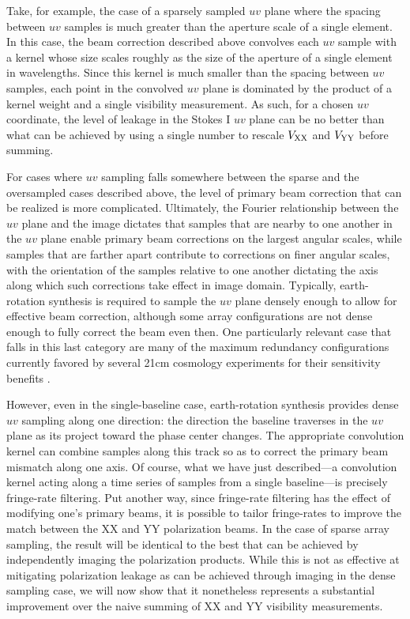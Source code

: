 \documentclass[twocolumn,apj,numberedappendix]{emulateapj}
\begin{document}
Take, for example, the case of a sparsely sampled $uv$ plane where the spacing between $uv$ samples is much greater than
the aperture scale of a single element.  In this case, the beam correction described above 
convolves each $uv$ sample with a kernel whose size scales roughly as the size of the aperture of a
single element in wavelengths.  Since this kernel is much smaller than the spacing between $uv$ samples, 
each point in the convolved $uv$ plane is dominated by the product of a kernel weight and a single visibility measurement.
As such, for a chosen $uv$ coordinate, the level of leakage in the Stokes I $uv$ plane can
be no better than what can be achieved by using a single number to rescale ${V_{\rm XX}}$ and ${V_{\rm YY}}$ before summing.  

For cases where $uv$ sampling falls somewhere between the sparse and the oversampled cases described above, the level
of primary beam correction that can be realized is more complicated.  Ultimately, the Fourier relationship between
the $uv$ plane and the image dictates that samples that are nearby to one
another in the $uv$ plane enable primary beam corrections on the largest angular scales, while samples that are farther
apart contribute to corrections on finer angular scales, with the orientation of the samples relative to one another
dictating the axis along which such corrections take effect in image domain.  Typically, earth-rotation synthesis
is required to sample the $uv$ plane densely enough to allow for effective beam correction, although some array
configurations are not dense enough to fully correct the beam even then.  One particularly relevant case that falls
in this last category are many of the maximum redundancy configurations currently favored by several 21cm cosmology experiments
for their sensitivity benefits \citep{parsons_et_al2012a,P14}.

However, even in the single-baseline case, earth-rotation synthesis provides dense $uv$ sampling along one direction: the
direction the baseline traverses in the $uv$ plane as its project toward the phase center changes.  The appropriate
convolution kernel can combine samples along this track so as to correct the primary beam mismatch along one axis.
Of course, what we have just described---a convolution kernel acting along a time series
of samples from a single baseline---is precisely fringe-rate filtering.  Put another way, since fringe-rate filtering has the effect of modifying one's primary beams, it is possible to tailor fringe-rates to improve the match between the XX and YY polarization beams. In the case of sparse array sampling, the result will be identical to the best that can be achieved by independently
imaging the polarization products.  While this is not as effective at mitigating polarization leakage as can be achieved
through imaging in the dense sampling case, we will now show that it nonetheless represents a substantial improvement
over the naive summing of XX and YY visibility measurements.
\end{document}
